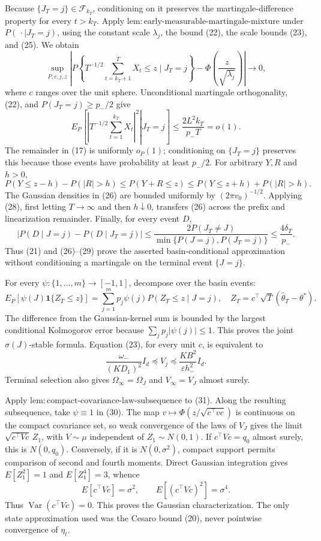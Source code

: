 Because \(\{J_T=j\}\in\mathcal F_{k_T}\), conditioning on it preserves the martingale-difference property for every \(t>k_T\).  Apply \(\mathrm{lem:early\text{-}measurable\text{-}martingale\text{-}mixture}\) under \(P(\,\cdot\mid J_T=j)\), using the constant scale \(\lambda_j\), the bound (22), the scale bounds (23), and (25).  We obtain
\[
 \sup_{P,c,j,z}\left|P\!\left\{T^{-1/2}\sum_{t=k_T+1}^TX_t\le z
 \mid J_T=j\right\}
 -\Phi\!\left(\frac z{\sqrt{\lambda_j}}\right)\right|\longrightarrow0,
\tag{26}
\]
where \(c\) ranges over the unit sphere.  Unconditional martingale orthogonality, (22), and \(P(J_T=j)\ge p_-/2\) give
\[
 E_P\!\left[\left.\left|T^{-1/2}\sum_{t=1}^{k_T}X_t\right|^2
 \right|J_T=j\right]
 \le\frac{2L^2k_T}{p_-T}=o(1).
\tag{27}
\]
The remainder in (17) is uniformly \(o_P(1)\); conditioning on \(\{J_T=j\}\) preserves this because those events have probability at least \(p_-/2\).  For arbitrary \(Y,R\) and \(h>0\),
\[
 P(Y\le z-h)-P(|R|>h)\le P(Y+R\le z)
 \le P(Y\le z+h)+P(|R|>h).
\tag{28}
\]
The Gaussian densities in (26) are bounded uniformly by \((2\pi v_0)^{-1/2}\).  Applying (28), first letting \(T\to\infty\) and then \(h\downarrow0\), transfers (26) across the prefix and linearization remainder.  Finally, for every event \(D\),
\[
 \left|P(D\mid J=j)-P(D\mid J_T=j)\right|
 \le\frac{2P(J_T\ne J)}{\min\{P(J=j),P(J_T=j)\}}
 \le\frac{4\delta_T}{p_-}.
\tag{29}
\]
Thus (21) and (26)--(29) prove the asserted basin-conditional approximation without conditioning a martingale on the terminal event \(\{J=j\}\).

For every \(\psi:\{1,\ldots,m\}\to[-1,1]\), decompose over the basin events:
\[
 E_P[\psi(J)\mathbf1\{Z_T\le z\}]
 =\sum_{j=1}^mp_j\psi(j)P(Z_T\le z\mid J=j),
 \quad Z_T=c^\top\sqrt T(\widehat\theta_T-\theta^*).
\tag{30}
\]
The difference from the Gaussian-kernel sum is bounded by the largest conditional Kolmogorov error because \(\sum_jp_j|\psi(j)|\le1\).  This proves the joint \(\sigma(J)\)-stable formula.  Equation (23), for every unit \(c\), is equivalent to
\[
 \frac{\omega_-}{(KD_1)^2}I_d\preceq V_j
 \preceq\frac{KB^2}{\varepsilon h_-^2}I_d.
\tag{31}
\]
Terminal selection also gives \(\Omega_\infty=\Omega_J\) and \(V_\infty=V_J\) almost surely.

Apply \(\mathrm{lem:compact\text{-}covariance\text{-}law\text{-}subsequence}\) to (31).  Along the resulting subsequence, take \(\psi\equiv1\) in (30).  The map \(v\mapsto\Phi(z/\sqrt{c^\top vc})\) is continuous on the compact covariance set, so weak convergence of the laws of \(V_J\) gives the limit \(\sqrt{c^\top Vc}\,Z_1\), with \(V\sim\mu\) independent of \(Z_1\sim N(0,1)\).  If \(c^\top Vc=q_0\) almost surely, this is \(N(0,q_0)\).  Conversely, if it is \(N(0,\sigma^2)\), compact support permits comparison of second and fourth moments.  Direct Gaussian integration gives \(E[Z_1^2]=1\) and \(E[Z_1^4]=3\), whence
\[
 E[c^\top Vc]=\sigma^2,
 \qquad E[(c^\top Vc)^2]=\sigma^4.
\tag{32}
\]
Thus \(\operatorname{Var}(c^\top Vc)=0\).  This proves the Gaussian characterization.  The only state approximation used was the Cesaro bound (20), never pointwise convergence of \(\eta_t\).